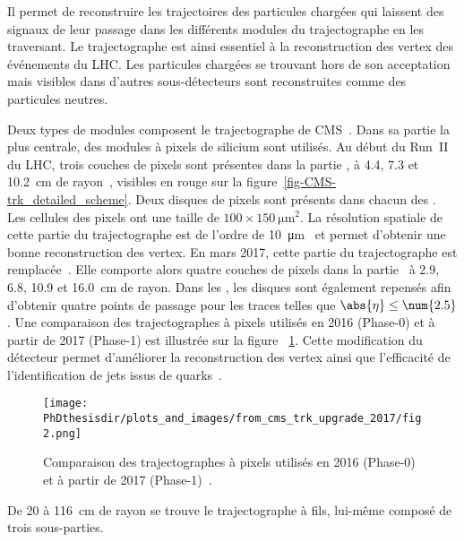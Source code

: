 Il permet de reconstruire les trajectoires des particules chargées qui laissent des signaux de leur passage dans les différents modules du trajectographe en les traversant.
Le trajectographe est ainsi essentiel à la reconstruction des vertex des événements du LHC.
Les particules chargées se trouvant hors de son acceptation mais visibles dans d'autres sous-détecteurs sont reconstruites comme des particules neutres.
\par Deux types de modules composent le trajectographe de CMS~\cite{cms_paper,CERN-LHCC-98-006,CMS-TDR-11,CMS-TRK-11-001,CMS-TRK-17-001}.
Dans sa partie la plus centrale, des modules à pixels de silicium sont utilisés.
Au début du Run~II du LHC, trois couches de pixels sont présentes dans la partie \CMSbarrel, à \num{4.4}, \num{7.3} et \SI{10.2}{\centi\meter} de rayon~\cite{cms_paper}, visibles en rouge sur la figure~\ref{fig-CMS-trk_detailed_scheme}.
Deux disques de pixels sont présents dans chacun des \CMSendcaps.
Les cellules des pixels ont une taille de $\num{100}\times\SI{150}{\micro\meter^2}$.
La résolution spatiale de cette partie du trajectographe est de l'ordre de \SI{10}{\micro\meter}~\cite{cms_paper} et permet d'obtenir une bonne reconstruction des vertex.
En mars 2017, cette partie du trajectographe est remplacée~\cite{CMS-TDR-11,cms_trk_upgrade_2017}.
Elle comporte alors quatre couches de pixels dans la partie \CMSbarrel\ à \num{2.9}, \num{6.8}, \num{10.9} et \SI{16.0}{\centi\meter} de rayon.
Dans les \CMSendcaps, les disques sont également repensés afin d'obtenir quatre points de passage pour les traces telles que $\abs{\eta}\leq\num{2.5}$.
Une comparaison des trajectographes à pixels utilisés en 2016 (Phase-0) et à partir de 2017 (Phase-1) est illustrée sur la figure ~\ref{fig-chapter-LHC-section-CMS-subsec-tracker-2017-upgrade}.
Cette modification du détecteur permet d'améliorer la reconstruction des vertex ainsi que l'efficacité de l'identification de jets issus de quarks~\quarkb.
\begin{figure}[t]
\centering
\texttt{[image: \\PhDthesisdir/plots\_and\_images/from\_cms\_trk\_upgrade\_2017/fig2.png]}
\caption[Comparaison des trajectographes à pixels utilisés en 2016 et à partir de 2017.]{Comparaison des trajectographes à pixels utilisés en 2016 (Phase-0) et à partir de 2017 (Phase-1)~\cite{CMS-TDR-11,cms_trk_upgrade_2017}.}
\label{fig-chapter-LHC-section-CMS-subsec-tracker-2017-upgrade}
\end{figure}
\par De \num{20} à \SI{116}{\centi\meter} de rayon se trouve le trajectographe à fils, lui-même composé de trois sous-parties.
